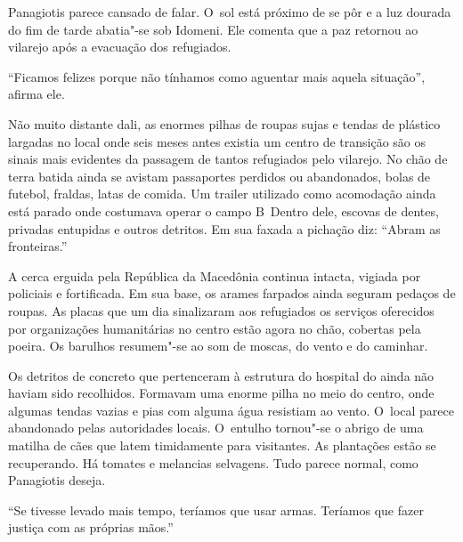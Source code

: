 Panagiotis parece cansado de falar. O~sol está próximo de se pôr e a luz
dourada do fim de tarde abatia"-se sob Idomeni. Ele comenta que a paz
retornou ao vilarejo após a evacuação dos refugiados.

``Ficamos felizes porque não tínhamos como aguentar mais aquela
situação'', afirma ele.

Não muito distante dali, as enormes pilhas de roupas sujas e tendas de
plástico largadas no local onde seis meses antes existia um centro de
transição são os sinais mais evidentes da passagem de tantos refugiados
pelo vilarejo. No chão de terra batida ainda se avistam passaportes
perdidos ou abandonados, bolas de futebol, fraldas, latas de comida. Um
trailer utilizado como acomodação ainda está parado onde costumava
operar o campo B\, Dentro dele, escovas de dentes, privadas entupidas e
outros detritos. Em sua faxada a pichação diz: ``Abram as fronteiras.''

A cerca erguida pela República da Macedônia continua intacta, vigiada
por policiais e fortificada. Em sua base, os arames farpados ainda
seguram pedaços de roupas. As placas que um dia sinalizaram aos
refugiados os serviços oferecidos por organizações humanitárias no
centro estão agora no chão, cobertas pela poeira. Os barulhos
resumem"-se ao som de moscas, do vento e do caminhar.

Os detritos de concreto que pertenceram à estrutura do hospital do 
ainda não haviam sido recolhidos. Formavam uma enorme pilha no meio do centro,
onde algumas tendas vazias e pias com alguma água resistiam ao vento. O~local parece abandonado pelas autoridades locais. O~entulho tornou"-se o
abrigo de uma matilha de cães que latem timidamente para visitantes. As
plantações estão se recuperando. Há tomates e melancias selvagens. Tudo
parece normal, como Panagiotis deseja.

``Se tivesse levado mais tempo, teríamos que usar armas. Teríamos que
fazer justiça com as próprias mãos.''

